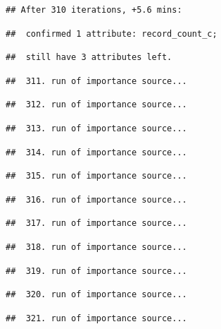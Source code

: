 \documentclass[
]{article}
\begin{document}
\begin{verbatim}
## After 310 iterations, +5.6 mins:
\end{verbatim}

\begin{verbatim}
##  confirmed 1 attribute: record_count_c;
\end{verbatim}

\begin{verbatim}
##  still have 3 attributes left.
\end{verbatim}

\begin{verbatim}
##  311. run of importance source...
\end{verbatim}

\begin{verbatim}
##  312. run of importance source...
\end{verbatim}

\begin{verbatim}
##  313. run of importance source...
\end{verbatim}

\begin{verbatim}
##  314. run of importance source...
\end{verbatim}

\begin{verbatim}
##  315. run of importance source...
\end{verbatim}

\begin{verbatim}
##  316. run of importance source...
\end{verbatim}

\begin{verbatim}
##  317. run of importance source...
\end{verbatim}

\begin{verbatim}
##  318. run of importance source...
\end{verbatim}

\begin{verbatim}
##  319. run of importance source...
\end{verbatim}

\begin{verbatim}
##  320. run of importance source...
\end{verbatim}

\begin{verbatim}
##  321. run of importance source...
\end{verbatim}
\end{document}
